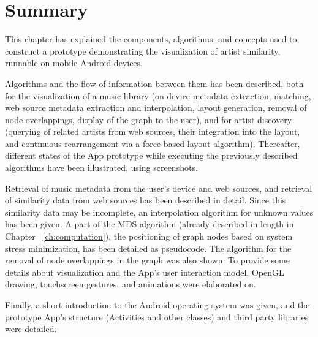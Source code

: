 \section{Summary}

This chapter has explained the components, algorithms, and concepts used to construct a prototype demonstrating the visualization of artist similarity, runnable on mobile Android devices.

Algorithms and the flow of information between them has been described, both for the visualization of a music library (on-device metadata extraction, matching, web source metadata extraction and interpolation, layout generation, removal of node overlappings, display of the graph to the user), and for artist discovery (querying of related artists from web sources, their integration into the layout, and continuous rearrangement via a force-based layout algorithm).
Thereafter, different states of the App prototype while executing the previously described algorithms have been illustrated, using screenshots.

Retrieval of music metadata from the user's device and web sources, and retrieval of similarity data from web sources has been described in detail. Since this similarity data may be incomplete, an interpolation algorithm for unknown values has been given.
A part of the MDS algorithm (already described in length in Chapter ~\ref{ch:computation}), the  positioning of graph nodes based on system stress minimization, has been detailed as pseudocode. The algorithm for the removal of node overlappings in the graph was also shown.
To provide some details about visualization and the App's user interaction model, OpenGL drawing, touchscreen gestures, and animations were elaborated on.

Finally, a short introduction to the Android operating system was given, and the prototype App's structure (Activities and other classes) and third party libraries were detailed.